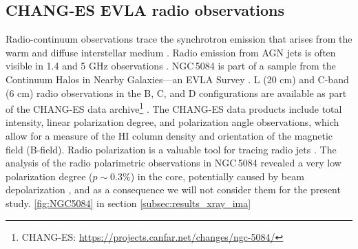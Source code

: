 \documentclass[modern]{CORE-AAS/aastex631}
\begin{document}
\subsection{CHANG-ES EVLA radio observations} \label{subsec:data_radiopol}
Radio-continuum observations trace the synchrotron emission that arises from the warm and diffuse interstellar medium \citep{beck+2013inbook_641}. Radio emission from AGN jets is often visible in 1.4 and 5 GHz observations \citep[20 cm and 6 cm]{sebastian+2019apj883_189, hardcastle+2020na88_101539}. NGC\,5084 is part of a sample from the Continuum Halos in Nearby Galaxies—an EVLA Survey \citep[CHANG-ES][]{irwin+2012aj144_43}. L (20 cm) and C-band (6 cm) radio observations in the B, C, and D configurations are available as part of the CHANG-ES data archive\footnote{CHANG-ES: \url{https://projects.canfar.net/changes/ngc-5084/}} \citep{wiegert+2015aj150_81, irwin+2019aj158_21}. 
The CHANG-ES data products include total intensity, linear polarization degree, and polarization angle observations, which allow for a measure of the HI column density and orientation of the magnetic field (B-field). Radio polarization is a valuable tool for tracing radio jets \citep{pasetto+2018aap613_74, sebastian+2020mnras499_334}. 
The analysis of the radio polarimetric observations in NGC\,5084 revealed a very low polarization degree ($p\sim0.3$\%) in the core, potentially caused by beam depolarization \citep{haverkorn+2004aap421_1011, pasetto+2018aap613_74}, and as a consequence we will not consider them for the present study.
\cite{pan+2019apj881_119}
\ref{fig:NGC5084} in section \ref{subsec:results_xray_ima}
\end{document}
